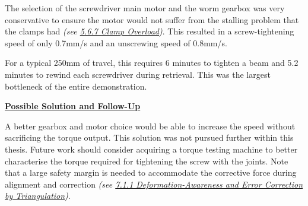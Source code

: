 \documentclass[11pt]{book}
\begin{document}
The selection of the screwdriver main motor and the worm gearbox was very conservative to ensure the motor would not suffer from the stalling problem that the clamps had\textit{ (see \uline{5.6.7 Clamp Overload})}. This resulted in a screw-tightening speed of only 0.7mm/s and an unscrewing speed of 0.8mm/s. 

For a typical 250mm of travel, this requires 6 minutes to tighten a beam and 5.2 minutes to rewind each screwdriver during retrieval. This was the largest bottleneck of the entire demonstration.

\textbf{\uline{Possible Solution and Follow-Up}}

A better gearbox and motor choice would be able to increase the speed without sacrificing the torque output. This solution was not pursued further within this thesis. Future work should consider acquiring a torque testing machine to better characterise the torque required for tightening the screw with the joints. Note that a large safety margin is needed to accommodate the corrective force during alignment and correction \textit{(see \uline{7.1.1 Deformation-Awareness and Error Correction by Triangulation})}. 
\end{document}
